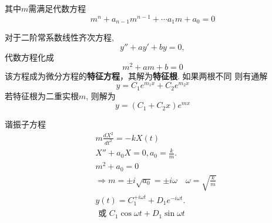 其中$m$需满足代数方程
$$
m^n+a_{n-1} m^{n-1}+\cdots a_1 m+a_0=0
$$

对于二阶常系数线性齐次方程, $$
y'' + a y' + by = 0,
$$
代数方程化成
\begin{equation}
    m^2 + a m + b = 0
\end{equation}
该方程成为微分方程的\textbf{特征方程}，其解为\textbf{特征根}. 如果两根不同
则有通解
\begin{equation}
    y = C_1 e^{m_1 x} +  C_2 e^{m_2 x} 
\end{equation}
若特征根为二重实根$m$, 则解为 
\begin{equation}
    y = (C_1 + C_2  x) e^{m x}
\end{equation}
\begin{example}
    谐振子方程
$$
\begin{aligned}
& m \frac{d X^2}{d t^2}=-k X(t) \\
& X''+a_0 X=0, a_0=\frac{k}{m} . \\
& m^2+a_0=0 \\
& \Rightarrow m= \pm i \sqrt{a_0}= \pm i \omega \quad \omega=\sqrt{\frac{k}{m}} \\
& y(t)=C_1 ^{+i \omega t}+D_{1} e^{-i \omega t} . \\
& \text { 或 } C_1 \cos \omega t+D_1 \sin \omega t
\end{aligned}
$$
\end{example}

